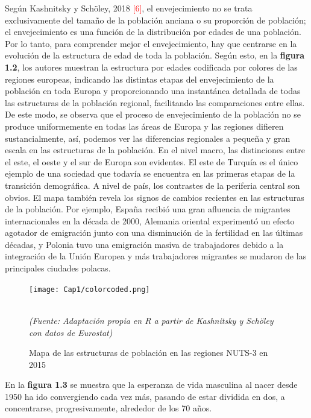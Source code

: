 Seg\'un Kashnitsky y Sch\"oley, 2018 \textcolor{red}{[6]}, el envejecimiento no se trata exclusivamente del tama\~no de la poblaci\'on anciana o su proporci\'on de poblaci\'on; el envejecimiento es una funci\'on de la distribuci\'on por edades de una poblaci\'on. Por lo tanto, para comprender mejor el envejecimiento, hay que centrarse en la evoluci\'on de la estructura de edad de toda la poblaci\'on. Seg\'un esto, en la \textbf{figura 1.2}, los autores muestran la estructura por edades codificada por colores de las regiones europeas, indicando las distintas etapas del envejecimiento de la poblaci\'on en toda Europa y proporcionando una instant\'anea detallada de todas las estructuras de la poblaci\'on regional, facilitando las comparaciones entre ellas. De este modo, se observa que el proceso de envejecimiento de la poblaci\'on no se produce uniformemente en todas las \'areas de Europa y las regiones difieren sustancialmente, as\'i, podemos ver las diferencias regionales a peque\~na y gran escala en las estructuras de la poblaci\'on. En el nivel macro, las distinciones entre el este, el oeste y el sur de Europa son evidentes. El este de Turqu\'ia es el \'unico ejemplo de una sociedad que todav\'ia se encuentra en las primeras etapas de la transici\'on demogr\'afica. A nivel de pa\'is, los contrastes de la periferia central son obvios. El mapa tambi\'en revela los signos de cambios recientes en las estructuras de la poblaci\'on. Por ejemplo, Espa\~na recibi\'o una gran afluencia de migrantes internacionales en la d\'ecada de 2000, Alemania oriental experiment\'o un efecto agotador de emigraci\'on junto con una disminuci\'on de la fertilidad en las \'ultimas d\'ecadas, y Polonia tuvo una emigraci\'on masiva de trabajadores debido a la integraci\'on de la Uni\'on Europea y m\'as trabajadores migrantes se mudaron de las principales ciudades polacas. 

\begin{figure}[!ht]
\centering
\hspace*{-0.5cm}
\texttt{[image: Cap1/colorcoded.png]}
\caption{Mapa de las estructuras de poblaci\'on en las regiones NUTS-3 en 2015}\\
\textit{(Fuente: Adaptaci\'on propia en R a partir de Kashnitsky y Sch\"oley con datos de Eurostat)}
\end{figure}

En la \textbf{figura 1.3} se muestra que la esperanza de vida masculina al nacer desde 1950 ha ido convergiendo cada vez m\'as, pasando de estar 
dividida en dos, a concentrarse, progresivamente, alrededor de los 70 a\~nos.

